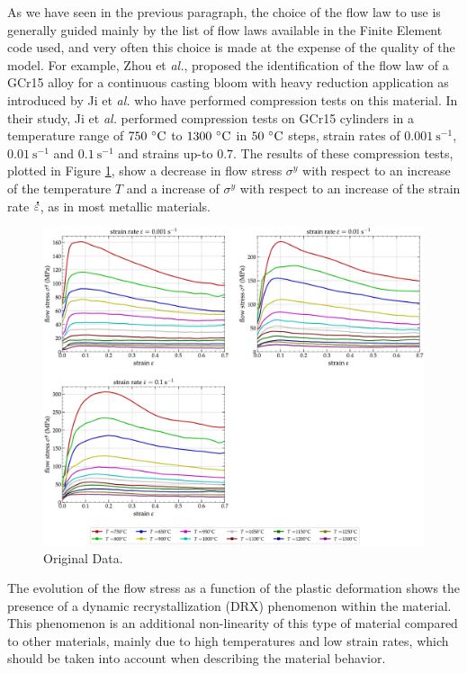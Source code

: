 \documentclass[algorithms,article,submit,pdftex,moreauthors]{Definitions/mdpi}
\makeatletter
\DeclareRobustCommand{\mdot}[1]{\accentset{\mbox{\bfseries .}}{#1}}
\DeclareRobustCommand{\eal}{et \emph{al.}\@\xspace}
\DeclareRobustCommand{\ps}{\text{s}^{-1}}
\makeatother
\begin{document}
As we have seen in the previous paragraph, the choice of the flow law to use is generally guided mainly by the list of flow laws available in the Finite Element code used, and very often this choice is made at the expense of the quality of the model.
For example, Zhou \eal \cite{Zhou-2020}, proposed the identification of the flow law of a GCr15 alloy for a continuous casting bloom with heavy reduction application as introduced by Ji \eal \cite{Ji-2018} who have performed compression tests on this material.
In their study, Ji \eal \cite{Ji-2018} performed compression tests on GCr15 cylinders in a temperature range of $750~\celsius$ to $1300~\celsius$ in $50~\celsius$ steps, strain rates of $0.001~\ps$,  $0.01~\ps$ and $0.1~\ps$ and strains up-to $0.7$.
The results of these compression tests, plotted in Figure \ref{fig:Zhou-OriginalData}, show a decrease in flow stress $\sigma^y$ with respect to an increase of the temperature $T$ and a increase of $\sigma^y$ with respect to an increase of the strain rate $\mdot\varepsilon$, as in most metallic materials.
\begin{figure}[!ht]
\centering
\includegraphics[width=0.9\columnwidth]{Figures/Zhou-OriginalData}
\caption{Original Data.}
\label{fig:Zhou-OriginalData}
\end{figure}
The evolution of the flow stress as a function of the plastic deformation shows the presence of a dynamic recrystallization (DRX) phenomenon within the material.
This phenomenon is an additional non-linearity of this type of material compared to other materials, mainly due to high temperatures and low strain rates, which should be taken into account when describing the material behavior.
\end{document}
